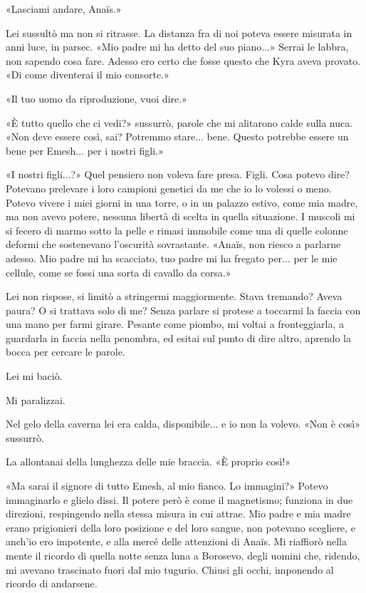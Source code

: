 «Lasciami andare, Anaïs.»

Lei sussultò ma non si ritrasse. La distanza fra di noi poteva essere
misurata in anni luce, in parsec. «Mio padre mi ha detto del suo
piano...» Serrai le labbra, non sapendo cosa fare. Adesso ero certo che
fosse questo che Kyra aveva provato. «Di come diventerai il mio
consorte.»

«Il tuo uomo da riproduzione, vuoi dire.»

«È tutto quello che ci vedi?» sussurrò, parole che mi alitarono calde
sulla nuca. «Non deve essere così, sai? Potremmo stare... bene. Questo
potrebbe essere un bene per Emesh... per i nostri figli.»

«I nostri figli...?» Quel pensiero non voleva fare presa. Figli. Cosa
potevo dire? Potevano prelevare i loro campioni genetici da me che io lo
volessi o meno. Potevo vivere i miei giorni in una torre, o in un
palazzo estivo, come mia madre, ma non avevo potere, nessuna libertà di
scelta in quella situazione. I muscoli mi si fecero di marmo sotto la
pelle e rimasi immobile come una di quelle colonne deformi che
sostenevano l'oscurità sovrastante. «Anaïs, non riesco a parlarne
adesso. Mio padre mi ha scacciato, tuo padre mi ha fregato per... per le
mie cellule, come se fossi una sorta di cavallo da corsa.»

Lei non rispose, si limitò a stringermi maggiormente. Stava tremando?
Aveva paura? O si trattava solo di me? Senza parlare si protese a
toccarmi la faccia con una mano per farmi girare. Pesante come piombo,
mi voltai a fronteggiarla, a guardarla in faccia nella penombra, ed
esitai sul punto di dire altro, aprendo la bocca per cercare le parole.

Lei mi baciò.

Mi paralizzai.

Nel gelo della caverna lei era calda, disponibile... e io non la volevo.
«Non è così» sussurrò.

La allontanai della lunghezza delle mie braccia. «È proprio così!»

«Ma sarai il signore di tutto Emesh, al mio fianco. Lo immagini?» Potevo
immaginarlo e glielo dissi. Il potere però è come il magnetismo;
funziona in due direzioni, respingendo nella stessa misura in cui
attrae. Mio padre e mia madre erano prigionieri della loro posizione e
del loro sangue, non potevano scegliere, e anch'io ero impotente, e alla
mercé delle attenzioni di Anaïs. Mi riaffiorò nella mente il ricordo di
quella notte senza luna a Borosevo, degli uomini che, ridendo, mi
avevano trascinato fuori dal mio tugurio. Chiusi gli occhi, imponendo al
ricordo di andarsene.

